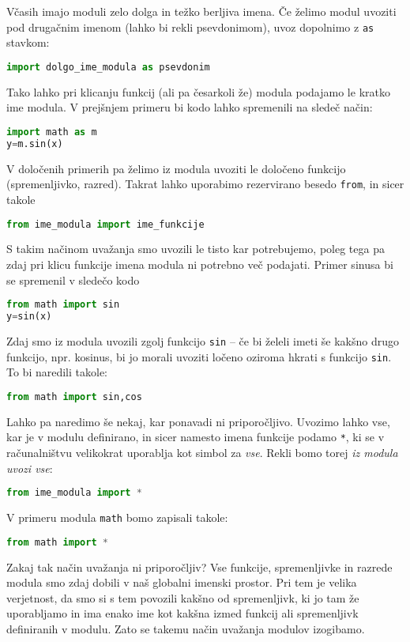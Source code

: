 Včasih imajo moduli zelo dolga in težko berljiva imena. Če želimo modul uvoziti pod drugačnim imenom (lahko bi rekli psevdonimom), uvoz dopolnimo z \texttt{as} stavkom:
\begin{lstlisting}[language=Python, showstringspaces=false]
import dolgo_ime_modula as psevdonim
\end{lstlisting}
Tako lahko pri klicanju funkcij (ali pa česarkoli že) modula podajamo le kratko ime modula. V prejšnjem primeru bi kodo lahko spremenili na sledeč način:
\begin{lstlisting}[language=Python, showstringspaces=false]
import math as m
y=m.sin(x)
\end{lstlisting}

V določenih primerih pa želimo iz modula uvoziti le določeno funkcijo (spremenljivko, razred). Takrat lahko uporabimo rezervirano besedo \texttt{from}, in sicer takole
\begin{lstlisting}[language=Python, showstringspaces=false]
from ime_modula import ime_funkcije
\end{lstlisting}
S takim načinom uvažanja smo uvozili le tisto kar potrebujemo, poleg tega pa zdaj pri klicu funkcije imena modula ni potrebno več podajati. Primer sinusa bi se spremenil v sledečo kodo
\begin{lstlisting}[language=Python, showstringspaces=false]
from math import sin
y=sin(x)
\end{lstlisting}
Zdaj smo iz modula uvozili zgolj funkcijo \texttt{sin} -- če bi želeli imeti še kakšno drugo funkcijo, npr. kosinus, bi jo morali uvoziti ločeno oziroma hkrati s funkcijo \texttt{sin}. To bi naredili takole:
\begin{lstlisting}[language=Python, showstringspaces=false]
from math import sin,cos
\end{lstlisting}
Lahko pa naredimo še nekaj, kar ponavadi ni priporočljivo. Uvozimo lahko vse, kar je v modulu definirano, in sicer namesto imena funkcije podamo \texttt{*}, ki se v računalništvu velikokrat uporablja kot simbol za \emph{vse}. Rekli bomo torej \emph{iz modula uvozi vse}:
\begin{lstlisting}[language=Python, showstringspaces=false]
from ime_modula import *
\end{lstlisting}
V primeru modula \texttt{math} bomo zapisali takole:
\begin{lstlisting}[language=Python, showstringspaces=false]
from math import *
\end{lstlisting}
Zakaj tak način uvažanja ni priporočljiv? Vse funkcije, spremenljivke in razrede modula smo zdaj dobili v naš globalni imenski prostor. Pri tem je velika verjetnost, da smo si s tem povozili kakšno od spremenljivk, ki jo tam že uporabljamo in ima enako ime kot kakšna izmed funkcij ali spremenljivk definiranih v modulu. Zato se takemu način uvažanja modulov izogibamo.

